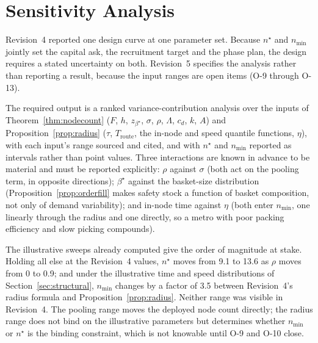 \section{Sensitivity Analysis}

Revision~4 reported one design curve at one parameter set. Because $n^\star$ and $n_{\min}$ jointly set the capital ask, the recruitment target and the phase plan, the design requires a stated uncertainty on both. Revision~5 specifies the analysis rather than reporting a result, because the input ranges are open items (O-9 through O-13).

The required output is a ranked variance-contribution analysis \cite{saltelli2008} over the inputs of Theorem~\ref{thm:nodecount} ($F$, $h$, $z_{\beta^\star}$, $\sigma$, $\rho$, $\Lambda$, $c_d$, $k$, $A$) and Proposition~\ref{prop:radius} ($\tau$, $T_{\mathrm{route}}$, the in-node and speed quantile functions, $\eta$), with each input's range sourced and cited, and with $n^\star$ and $n_{\min}$ reported as intervals rather than point values. Three interactions are known in advance to be material and must be reported explicitly: $\rho$ against $\sigma$ (both act on the pooling term, in opposite directions); $\beta^\star$ against the basket-size distribution (Proposition~\ref{prop:orderfill} makes safety stock a function of basket composition, not only of demand variability); and in-node time against $\eta$ (both enter $n_{\min}$, one linearly through the radius and one directly, so a metro with poor packing efficiency and slow picking compounds).

The illustrative sweeps already computed give the order of magnitude at stake. Holding all else at the Revision~4 values, $n^\star$ moves from 9.1 to 13.6 as $\rho$ moves from 0 to 0.9; and under the illustrative time and speed distributions of Section~\ref{sec:structural}, $n_{\min}$ changes by a factor of 3.5 between Revision~4's radius formula and Proposition~\ref{prop:radius}. Neither range was visible in Revision~4. The pooling range moves the deployed node count directly; the radius range does not bind on the illustrative parameters but determines whether $n_{\min}$ or $n^\star$ is the binding constraint, which is not knowable until O-9 and O-10 close.
